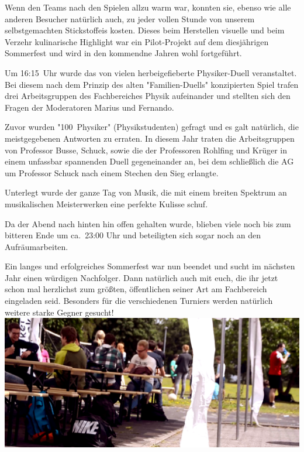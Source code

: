 \begin{multicols*}{2}
Wenn den Teams nach den Spielen allzu warm war, konnten sie, ebenso wie alle anderen Besucher natürlich auch, zu jeder vollen Stunde von unserem selbstgemachten Stickstoffeis kosten. Dieses beim Herstellen visuelle und beim Verzehr kulinarische Highlight war ein Pilot-Projekt auf dem diesjährigen Sommerfest und wird in den kommendne Jahren wohl fortgeführt. 

Um 16:15~Uhr wurde das von vielen herbeigefieberte Physiker-Duell veranstaltet.
Bei diesem nach dem Prinzip des alten "Familien-Duells" konzipierten Spiel trafen drei Arbeitsgruppen des Fachbereiches Physik aufeinander und stellten sich den Fragen der Moderatoren Marius und Fernando.

Zuvor wurden "100~Physiker" (Physikstudenten) gefragt und es galt natürlich, die meistgegebenen Antworten zu erraten.
In diesem Jahr traten die Arbeitsgruppen von Professor Busse, Schuck, sowie die der Professoren Rohlfing und Krüger in einem unfassbar spannenden Duell gegeneinander an, bei dem schließlich die AG um Professor Schuck nach einem Stechen den Sieg erlangte.

Unterlegt wurde der ganze Tag von Musik, die mit einem breiten Spektrum an musikalischen Meisterwerken eine perfekte Kulisse schuf.

Da der Abend nach hinten hin offen gehalten wurde, blieben viele noch bis zum bitteren Ende um ca.~23:00 Uhr und beteiligten sich sogar noch an den Aufräumarbeiten.

Ein langes und erfolgreiches Sommerfest war nun beendet und sucht im nächsten Jahr einen würdigen Nachfolger.
Dann natürlich auch mit euch, die ihr jetzt schon mal herzlichst zum größten, öffentlichen seiner Art am Fachbereich eingeladen seid.
Besonders für die verschiedenen Turniers werden natürlich weitere starke Gegner gesucht!
\includegraphics[width=\columnwidth]{res/sommerfest_zelt_cropped}
\end{multicols*}
